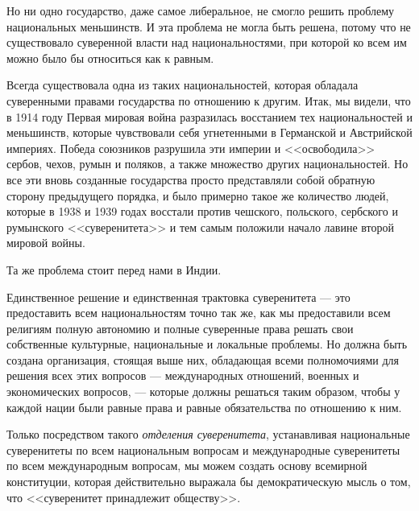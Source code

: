Но ни одно государство, даже самое либеральное, не смогло решить проблему национальных меньшинств. И эта проблема не могла быть решена, потому что не существовало суверенной власти над национальностями, при которой ко всем им можно было бы относиться как к равным.

Всегда существовала одна из таких национальностей, которая обладала суверенными правами государства по отношению к другим. Итак, мы видели, что в 1914 году Первая мировая война разразилась восстанием тех национальностей и меньшинств, которые чувствовали себя угнетенными в Германской и Австрийской империях. Победа союзников разрушила эти империи и <<освободила>> сербов, чехов, румын и поляков, а также множество других национальностей. Но все эти вновь созданные государства просто представляли собой обратную сторону предыдущего порядка, и было примерно такое же количество людей, которые в 1938 и 1939 годах восстали против чешского, польского, сербского и румынского <<суверенитета>> и тем самым положили начало лавине второй мировой войны.

Та же проблема стоит перед нами в Индии.

Единственное решение и единственная трактовка суверенитета — это предоставить всем национальностям точно так же, как мы предоставили всем религиям полную автономию и полные суверенные права решать свои собственные культурные, национальные и локальные проблемы. Но должна быть создана организация, стоящая выше них, обладающая всеми полномочиями для решения всех этих вопросов — международных отношений, военных и экономических вопросов, — которые должны решаться таким образом, чтобы у каждой нации были равные права и равные обязательства по отношению к ним.

Только посредством такого \textit{отделения суверенитета}, устанавливая национальные суверенитеты по всем национальным вопросам и международные суверенитеты по всем международным вопросам, мы можем создать основу всемирной конституции, которая действительно выражала бы демократическую мысль о том, что <<суверенитет принадлежит обществу>>.
